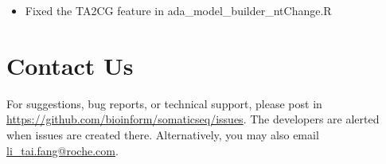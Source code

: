 \documentclass[10pt,letterpaper]{article}
\begin{document}
\begin{sloppypar}
\begin{enumerate}
		\begin{itemize}
		
			\item Fixed the TA2CG feature in ada\_model\_builder\_ntChange.R
		
		\end{itemize}


\end{enumerate}




\section{Contact Us}
For suggestions, bug reports, or technical support, please post in \href{https://github.com/bioinform/somaticseq/issues}{https://github.com/bioinform/somaticseq/issues}. The developers are alerted when issues are created there. Alternatively, you may also email \href{mailto:li_tai.fang@roche.com}{li\_tai.fang@roche.com}. 

\end{sloppypar}
\end{document}

